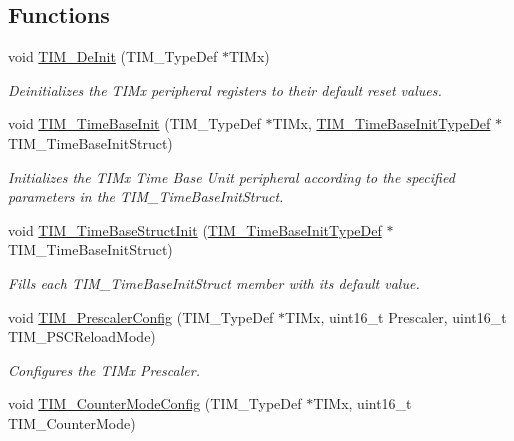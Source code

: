 \subsection*{Functions}
\begin{DoxyCompactItemize}
\item 
void \hyperlink{group___t_i_m_ga1659cc0ce503ac151568e0c7c02b1ba5}{T\-I\-M\-\_\-\-De\-Init} (T\-I\-M\-\_\-\-Type\-Def $\ast$T\-I\-Mx)
\begin{DoxyCompactList}\small\item\em Deinitializes the T\-I\-Mx peripheral registers to their default reset values. \end{DoxyCompactList}\item 
void \hyperlink{group___t_i_m_ga83fd58c9416802d9638bbe1715c98932}{T\-I\-M\-\_\-\-Time\-Base\-Init} (T\-I\-M\-\_\-\-Type\-Def $\ast$T\-I\-Mx, \hyperlink{struct_t_i_m___time_base_init_type_def}{T\-I\-M\-\_\-\-Time\-Base\-Init\-Type\-Def} $\ast$T\-I\-M\-\_\-\-Time\-Base\-Init\-Struct)
\begin{DoxyCompactList}\small\item\em Initializes the T\-I\-Mx Time Base Unit peripheral according to the specified parameters in the T\-I\-M\-\_\-\-Time\-Base\-Init\-Struct. \end{DoxyCompactList}\item 
void \hyperlink{group___t_i_m_ga1556a0b9a5d53506875fd7de0cbc6b1f}{T\-I\-M\-\_\-\-Time\-Base\-Struct\-Init} (\hyperlink{struct_t_i_m___time_base_init_type_def}{T\-I\-M\-\_\-\-Time\-Base\-Init\-Type\-Def} $\ast$T\-I\-M\-\_\-\-Time\-Base\-Init\-Struct)
\begin{DoxyCompactList}\small\item\em Fills each T\-I\-M\-\_\-\-Time\-Base\-Init\-Struct member with its default value. \end{DoxyCompactList}\item 
void \hyperlink{group___t_i_m_ga45c6fd9041baf7f64c121e0172f305c7}{T\-I\-M\-\_\-\-Prescaler\-Config} (T\-I\-M\-\_\-\-Type\-Def $\ast$T\-I\-Mx, uint16\-\_\-t Prescaler, uint16\-\_\-t T\-I\-M\-\_\-\-P\-S\-C\-Reload\-Mode)
\begin{DoxyCompactList}\small\item\em Configures the T\-I\-Mx Prescaler. \end{DoxyCompactList}\item 
void \hyperlink{group___t_i_m_ga93941c1db20bf3794f377307df90a67b}{T\-I\-M\-\_\-\-Counter\-Mode\-Config} (T\-I\-M\-\_\-\-Type\-Def $\ast$T\-I\-Mx, uint16\-\_\-t T\-I\-M\-\_\-\-Counter\-Mode)

\end{DoxyCompactItemize}
